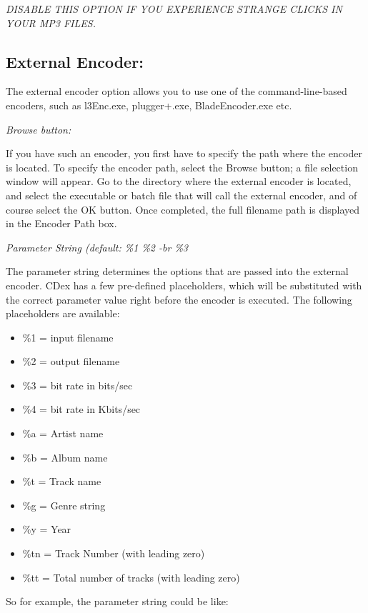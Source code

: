{\it DISABLE THIS OPTION IF YOU EXPERIENCE STRANGE CLICKS IN YOUR MP3 FILES.}


\subsection{External Encoder:}

The external encoder option allows you to use one of the command-line-based encoders, such as l3Enc.exe,
plugger+.exe, BladeEncoder.exe etc. 

{\it Browse button:}

If you have such an encoder, you first have to specify the path where the encoder is located. To
specify the encoder path, select the Browse button; a file selection window will appear. Go to the
directory where the external encoder is located, and select the executable or batch file that will
call the external encoder, and of course select the OK button. Once completed, the full filename path
is displayed in the Encoder Path box.


{\it Parameter String (default: \%1 \%2 -br \%3}

The parameter string determines the options that are passed into the external encoder.
CDex has a few pre-defined placeholders, which will be substituted with the correct parameter value
right before the encoder is executed. The following placeholders are available:

\begin{itemize}
\itemsep=0pt
\item \%1 = input filename
\item \%2 = output filename
\item \%3 = bit rate in bits/sec
\item \%4 = bit rate in Kbits/sec
\item \%a = Artist name
\item \%b = Album name
\item \%t = Track name
\item \%g = Genre string
\item \%y = Year
\item \%tn = Track Number (with leading zero)
\item \%tt = Total number of tracks (with leading zero)
\end{itemize}

So for example, the parameter string could be like:

